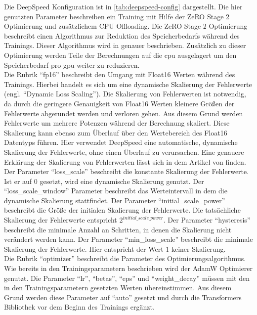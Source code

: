 Die DeepSpeed Konfiguration ist in \cref{tab:deepspeed-config} dargestellt.
Die hier genutzten Parameter beschreiben ein Training mit Hilfe der ZeRO Stage 2 Optimierung und zusätzlichem CPU Offloading.
Die ZeRO Stage 2 Optimierung beschreibt einen Algorithmus zur Reduktion des Speicherbedarfs während des Trainings.
Dieser Algorithmus wird in \citet{deepspeed} genauer beschrieben.
Zusätzlich zu dieser Optimierung werden Teile der Berechnungen auf die \ac{cpu} ausgelagert um den Speicherbedarf pro \ac{gpu} weiter zu reduzieren.\\

Die Rubrik \enquote{fp16} beschreibt den Umgang mit Float16 Werten während des Trainings.
Hierbei handelt es sich um eine dynamische Skalierung der Fehlerwerte (engl. \enquote{Dynamic Loss Scaling}).
Die Skalierung von Fehlerwerten ist notwendig, da durch die geringere Genauigkeit von Float16 Werten kleinere Größen der Fehlerwerte abgerundet werden und verloren gehen.
Aus diesem Grund werden Fehlerwerte um mehrere Potenzen während der Berechnung skaliert.
Diese Skalierung kann ebenso zum Überlauf über den Wertebereich des Float16 Datentyps führen.
Hier verwendet DeepSpeed eine automatische, dynamische Skalierung der Fehlerwerte, ohne einen Überlauf zu verursachen.
Eine genauere Erklärung der Skalierung von Fehlerwerten lässt sich in dem Artikel von \citet{lossscale} finden.
Der Parameter \enquote{loss\_scale} beschreibt die konstante Skalierung der Fehlerwerte.
Ist er auf $0$ gesetzt, wird eine dynamische Skalierung genutzt.
Der \enquote{loss\_scale\_window} Parameter beschreibt das Werteintervall in dem die dynamische Skalierung stattfindet.
Der Parameter \enquote{initial\_scale\_power} beschreibt die Größe der initialen Skalierung der Fehlerwerte.
Die tatsächliche Skalierung der Fehlerwerte entspricht $2^{initial\_scale\_power}$.
Der Parameter \enquote{hysteresis} beschreibt die minimale Anzahl an Schritten, in denen die Skalierung nicht verändert werden kann.
Der Parameter \enquote{min\_loss\_scale} beschreibt die minimale Skalierung der Fehlerwerte.
Hier entspricht der Wert $1$ keiner Skalierung.\\

Die Rubrik \enquote{optimizer} beschreibt die Parameter des Optimierungsalgorithmus. Wie bereits in den Trainingsparametern beschrieben wird der AdamW Optimierer genutzt.
Die Parameter \enquote{lr}, \enquote{betas}, \enquote{eps} und \enquote{weight\_decay} müssen mit den in den Trainingsparametern gesetzten Werten übereinstimmen.
Aus diesem Grund werden diese Parameter auf \enquote{auto} gesetzt und durch die Transformers Bibliothek vor dem Beginn des Trainings ergänzt.\\

